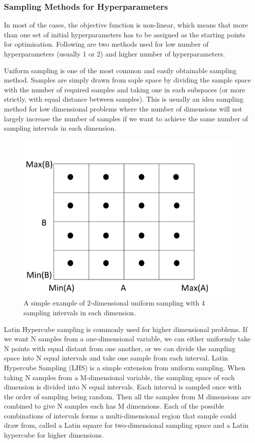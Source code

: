 \documentclass[14pt]{report}
\numberwithin{equation}{chapter}
\begin{document}
\begin{spacing}{2}
\subsubsection{Sampling Methods for Hyperparameters}
In most of the cases, the objective function is non-linear, which means that more than one set of initial hyperparameters has to be assigned as the starting points for optimisation. Following are two methods used for low number of hyperparameters (usually 1 or 2) and higher number of hyperparameters.


Uniform sampling is one of the most common and easily obtainable sampling method. Samples are simply drawn from saple space by dividing the sample space with the number of required samples and taking one in each subspaces (or more strictly, with equal distance between samples). This is usually an idea sampling method for low dimensional problems where the number of dimensions will not largely increase the number of samples if we want to achieve the same number of sampling intervals in each dimension. 

\begin{figure}
\centering
\includegraphics[scale=0.3]{Uniform_sampling.pdf}
\caption{A simple example of 2-dimensional uniform sampling with 4 sampling intervals in each dimension.}
\end{figure}


Latin Hypercube sampling is commonly used for higher dimensional problems. If we want N samples from a one-dimensional variable, we can either uniformly take N points with equal distant from one another, or we can divide the sampling space into N equal intervals and take one sample from each interval. Latin Hypercube Sampling (LHS) is a simple extension from uniform sampling. When taking N samples from a M-dimensional variable, the sampling space of each dimension is divided into N equal intervals. Each interval is sampled once with the order of sampling being random. Then all the samples from M dimensions are combined to give N samples each has M dimensions. Each of the possible combinations of intervals forms a multi-dimensional region that sample could draw from, called a Latin square for two-dimensional sampling space and a Latin hypercube for higher dimensions. 


\end{spacing}
\end{document}
